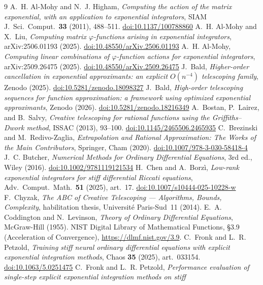 \documentclass[11pt]{article}
\theoremstyle{plain}
\theoremstyle{definition}
\theoremstyle{remark}
\newcommand{\doi}[1]{\href{https://doi.org/#1}{doi:#1}}
\begin{document}
\begin{thebibliography}{9}
 A.~H. Al-Mohy and N.~J. Higham, \emph{Computing the action
of the matrix exponential, with an application to exponential integrators},
SIAM J.\ Sci.\ Comput.\ \textbf{33} (2011), 488--511. \doi{10.1137/100788860}
 A.~H. Al-Mohy and X.~Liu, \emph{Computing matrix
$\varphi$-functions arising in exponential integrators}, arXiv:2506.01193
(2025). \doi{10.48550/arXiv.2506.01193}
 A.~H. Al-Mohy, \emph{Computing linear combinations of
$\varphi$-function actions for exponential integrators}, arXiv:2509.26475
(2025). \doi{10.48550/arXiv.2509.26475}
 J.~Bald, \emph{Higher-order cancellation in
exponential approximants: an explicit $O(n^{-4})$ telescoping family}, Zenodo
(2025). \doi{10.5281/zenodo.18098327}
 J.~Bald, \emph{High-order telescoping sequences for
function approximation: a framework using optimized exponential approximants},
Zenodo (2026). \doi{10.5281/zenodo.18216349}
 A.~Bostan, P.~Lairez, and B.~Salvy, \emph{Creative
telescoping for rational functions using the Griffiths--Dwork method}, ISSAC
(2013), 93--100. \doi{10.1145/2465506.2465935}
 C.~Brezinski and M.~Redivo-Zaglia, \emph{Extrapolation and
Rational Approximation: The Works of the Main Contributors}, Springer, Cham
(2020). \doi{10.1007/978-3-030-58418-4}
 J.~C. Butcher, \emph{Numerical Methods for Ordinary
Differential Equations}, 3rd ed., Wiley (2016). \doi{10.1002/9781119121534}
 H.~Chen and A.~Borz\`i, \emph{Low-rank exponential
integrators for stiff differential Riccati equations}, Adv.\ Comput.\ Math.\
\textbf{51} (2025), art.\ 17. \doi{10.1007/s10444-025-10228-w}
 F.~Chyzak, \emph{The ABC of Creative Telescoping --- Algorithms,
Bounds, Complexity}, habilitation thesis, Universit\'e Paris-Sud~11 (2014).
\bibitem{CoddingtonLevinson} E.~A. Coddington and N.~Levinson, \emph{Theory of
Ordinary Differential Equations}, McGraw-Hill (1955).
 NIST Digital Library of Mathematical Functions, \S3.9
(Acceleration of Convergence), \url{https://dlmf.nist.gov/3.9}.
 C.~Fronk and L.~R. Petzold, \emph{Training stiff
neural ordinary differential equations with explicit exponential integration
methods}, Chaos \textbf{35} (2025), art.\ 033154. \doi{10.1063/5.0251475}
\bibitem{FronkPetzoldArxiv} C.~Fronk and L.~R. Petzold, \emph{Performance
evaluation of single-step explicit exponential integration methods on stiff
}
\end{thebibliography}
\end{document}
